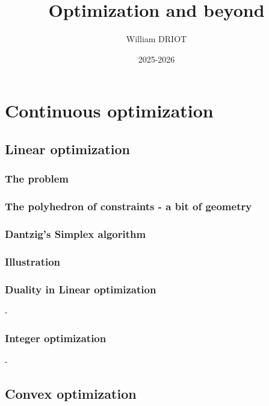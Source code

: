 \documentclass[12pt,openany,oneside]{book}
\title{\textbf{Optimization and beyond}}
\author{William DRIOT}
\date{2025-2026}
\theoremstyle{definition}
\numberwithin{exercise}{section}
\numberwithin{definition}{section}
\numberwithin{theorem}{section}
\numberwithin{corollary}{section}
\numberwithin{proposition}{section}
\numberwithin{notation}{section}
\numberwithin{remark}{section}
\numberwithin{hypothesis}{section}
\numberwithin{example}{section}
\begin{document}
\maketitle

\tableofcontents

\setlength{\parindent}{15pt}
\setlength{\parskip}{6pt}

\newpage



\part{Continuous optimization}

\chapter{Linear optimization}

\section{The problem}

\section{The polyhedron of constraints - a bit of geometry}

\section{Dantzig's Simplex algorithm}

\section{Illustration}

\section{Duality in Linear optimization}\label{sec:duality-lin-prog}-
\section{Integer optimization}-

\chapter{Convex optimization}

\end{document}
